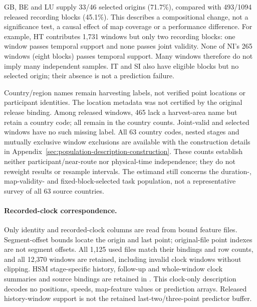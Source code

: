 GB, BE and LU supply 33/46 selected origins (71.7\%), compared with 493/1094
released recording blocks (45.1\%). This describes a compositional change,
not a significance test, a causal effect of map coverage or a performance
difference. For example, HT contributes 1,731 windows but only two recording
blocks: one window passes temporal support and none passes joint validity.
None of NI's 265 windows (eight blocks) passes temporal support.
Many windows therefore do not imply many independent samples.
IT and SI also have eligible blocks but no selected origin; their absence
is not a prediction failure.

Country/region names remain harvesting labels, not verified point locations
or participant identities. The location metadata was not certified by the
original release binding. Among released windows, 465 lack a harvest-area
name but retain a country code; all remain in the country counts.
Joint-valid and selected windows have no such missing label.
All 63 country codes, nested stages and mutually exclusive window exclusions
are available with the construction details in
Appendix~\ref{sec:population-description-construction}.
These counts establish neither participant/near-route nor physical-time
independence; they do not reweight results or resample intervals.
The estimand still concerns the duration-, map-validity- and fixed-block-selected
task population, not a representative survey of all 63 source countries.

\paragraph{Recorded-clock correspondence.}
Only identity and recorded-clock columns are read from bound feature files.
Segment-offset bounds locate the origin and last point; original-file point
indexes are not segment offsets. All 1,125 used files match their bindings
and row counts, and all 12,370 windows are retained, including invalid clock
windows without clipping. HSM stage-specific history, follow-up and
whole-window clock summaries and source bindings are retained in
.
This clock-only description decodes no positions, speeds, map-feature values
or prediction arrays. Released history-window support is not the retained
last-two/three-point predictor buffer.

